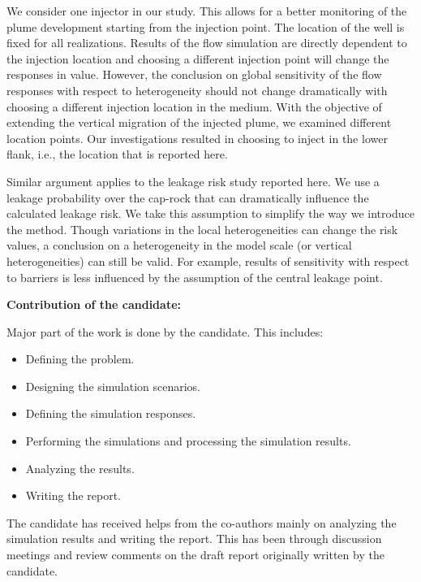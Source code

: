 {We consider one injector in our study. This allows for a better monitoring of the plume development starting from the injection point. The location of the well is fixed for all realizations. Results of the flow simulation are directly dependent to the injection location and choosing a different injection point will change the responses in value. However, the conclusion on global sensitivity of the flow responses with respect to heterogeneity should not change dramatically with choosing a different injection location in the medium. With the objective of extending the vertical migration of the injected plume, we examined different location points. Our investigations resulted in choosing to inject in the lower flank, i.e., the location that is reported here. 

Similar argument applies to the leakage risk study reported here. We use a leakage probability over the cap-rock that can dramatically influence the calculated leakage risk. We take this assumption to simplify the way we introduce the method. Though variations in the local heterogeneities can change the risk values, a conclusion on a heterogeneity in the model scale (or vertical heterogeneities) can still be valid. For example, results of sensitivity with respect to barriers is less influenced by the assumption of the central leakage point.  

\vspace{0.5cm}
\noindent\textbf{Contribution of the candidate:}

Major part of the work is done by the candidate. This includes:
\begin{itemize}
\item Defining the problem.
\item Designing the simulation scenarios.
\item Defining the simulation responses.
\item Performing the simulations  and processing the simulation results.
\item Analyzing the results.
\item Writing the report.
\end{itemize}

The candidate has received helps from the co-authors mainly on analyzing the simulation  results and writing the report. This has been through discussion meetings and review comments on the draft report originally written by the candidate.  

}%


